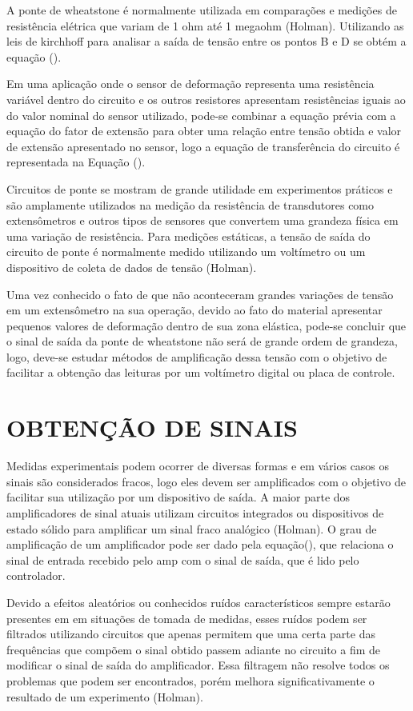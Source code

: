 A ponte de wheatstone é normalmente utilizada em comparações e medições de resistência elétrica que variam de 1 ohm até 1 megaohm (Holman). Utilizando as leis de kirchhoff para analisar a saída de tensão entre os pontos B e D se obtém a equação ().

Em uma aplicação onde o sensor de deformação representa uma resistência variável dentro do circuito e os outros resistores apresentam resistências iguais ao do valor nominal do sensor utilizado, pode-se combinar a equação prévia com a equação do fator de extensão para obter uma relação entre tensão obtida e valor de extensão apresentado no sensor, logo a equação de transferência do circuito é representada na Equação ().

Circuitos de ponte se mostram de grande utilidade em experimentos práticos e são amplamente utilizados na medição da resistência de transdutores como extensômetros e outros tipos de sensores que convertem uma grandeza física em uma variação de resistência. Para medições estáticas, a tensão de saída do circuito de ponte é normalmente medido utilizando um voltímetro ou um dispositivo de coleta de dados de tensão (Holman).

Uma vez conhecido o fato de que não aconteceram grandes variações de tensão em um extensômetro na sua operação, devido ao fato do material apresentar pequenos valores de deformação dentro de sua zona elástica, pode-se concluir que o sinal de saída da ponte de wheatstone não será de grande ordem de grandeza, logo, deve-se estudar métodos de amplificação dessa tensão com o objetivo de facilitar a obtenção das leituras por um voltímetro digital ou placa de controle.

\section{OBTENÇÃO DE SINAIS}

Medidas experimentais podem ocorrer de diversas formas e em vários casos os sinais são considerados fracos, logo eles devem ser amplificados com o objetivo de facilitar sua utilização por um dispositivo de saída. A maior parte dos amplificadores de sinal atuais utilizam circuitos integrados ou dispositivos de estado sólido para amplificar um sinal fraco analógico (Holman). O grau de amplificação de um amplificador pode ser dado pela equação(), que relaciona o sinal de entrada recebido pelo amp com o sinal de saída, que é lido pelo controlador.

Devido a efeitos aleatórios ou conhecidos ruídos característicos sempre estarão presentes em em situações de tomada de medidas, esses ruídos podem ser filtrados utilizando circuitos que apenas permitem que uma certa parte das frequências que compõem o sinal obtido passem adiante no circuito a fim de modificar o sinal de saída do amplificador. Essa filtragem não resolve todos os problemas que podem ser encontrados, porém melhora significativamente o resultado de um experimento (Holman).

